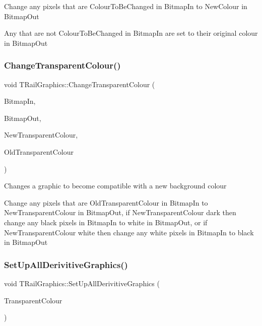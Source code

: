 Change any pixels that are Colour\+To\+Be\+Changed in Bitmap\+In to New\+Colour in Bitmap\+Out

Any that are not Colour\+To\+Be\+Changed in Bitmap\+In are set to their original colour in Bitmap\+Out \mbox{\label{class_t_rail_graphics_a89a3e3a91129c4d02f4606478781b519}} 
\subsubsection{\texorpdfstring{Change\+Transparent\+Colour()}{ChangeTransparentColour()}}
{\footnotesize\ttfamily void T\+Rail\+Graphics\+::\+Change\+Transparent\+Colour (\begin{DoxyParamCaption}\item[{Graphics\+::\+T\+Bitmap $\ast$}]{Bitmap\+In,  }\item[{Graphics\+::\+T\+Bitmap $\ast$}]{Bitmap\+Out,  }\item[{T\+Color}]{New\+Transparent\+Colour,  }\item[{T\+Color}]{Old\+Transparent\+Colour }\end{DoxyParamCaption})}

Changes a graphic to become compatible with a new background colour

Change any pixels that are Old\+Transparent\+Colour in Bitmap\+In to New\+Transparent\+Colour in Bitmap\+Out, if New\+Transparent\+Colour dark then change any black pixels in Bitmap\+In to white in Bitmap\+Out, or if New\+Transparent\+Colour white then change any white pixels in Bitmap\+In to black in Bitmap\+Out \mbox{\label{class_t_rail_graphics_ae19696d461eea07c5444ed4c9714acf3}} 
\subsubsection{\texorpdfstring{Set\+Up\+All\+Derivitive\+Graphics()}{SetUpAllDerivitiveGraphics()}}
{\footnotesize\ttfamily void T\+Rail\+Graphics\+::\+Set\+Up\+All\+Derivitive\+Graphics (\begin{DoxyParamCaption}\item[{T\+Color}]{Transparent\+Colour }\end{DoxyParamCaption})}


